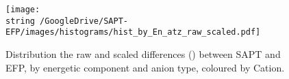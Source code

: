 %
%
%
%
%

\begin{figure}[h]
    \caption{Distribution the raw and scaled differences (\enUnit) between SAPT and EFP, by energetic component and anion type, coloured by Cation.}
    \label{fig:hist-raw-scaled-atz}
    \centering
    \texttt{[image: \\string~/GoogleDrive/SAPT-EFP/images/histograms/hist\_by\_En\_atz\_raw\_scaled.pdf]}
\end{figure}


